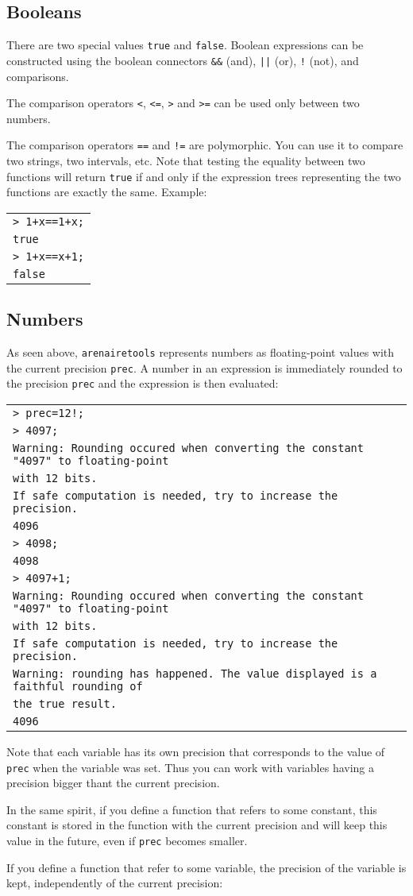 \documentclass[a4paper]{article}
\newcommand{\com}[1]{\texttt{#1}}
\newcommand{\key}[1]{\texttt{#1}}
\newcommand{\arenairetools}{\texttt{arenairetools}\xspace}
\newcommand{\code}[1]{\begin{center}
\begin{tabular}{|p{14.8cm}|}
\hline
#1
\hline
\end{tabular}
\end{center}
}
\newcommand{\ligne}[1]{\texttt{#1}\\}
\begin{document}
\subsection{Booleans}
There are two special values \key{true} and \key{false}. Boolean expressions can be constructed using the boolean connectors \key{\&\&} (and), \key{||} (or), \key{!} (not), and comparisons.

The comparison operators \key{<}, \key{<=}, \key{>} and \key{>=} can be used only between two numbers.

The comparison operators \key{==} and \key{!=} are polymorphic. You can use it to compare two strings, two intervals, etc. Note that testing the equality between two functions will return \key{true} if and only if the expression trees representing the two functions are exactly the same. Example:

\code{
\ligne{> 1+x==1+x;}
\ligne{true}
\ligne{> 1+x==x+1;}
\ligne{false}
}

\subsection{Numbers}
As seen above, \arenairetools represents numbers as floating-point values with the current precision \com{prec}. A number in an expression is immediately rounded to the precision \com{prec} and the expression is then evaluated:

\code{
\ligne{> prec=12!;}
\ligne{> 4097;}
\ligne{Warning: Rounding occured when converting the constant "4097" to floating-point}
\ligne{with 12 bits.}
\ligne{If safe computation is needed, try to increase the precision.}
\ligne{4096}
\ligne{> 4098;}
\ligne{4098}
\ligne{> 4097+1;}
\ligne{Warning: Rounding occured when converting the constant "4097" to floating-point}
\ligne{with 12 bits.}
\ligne{If safe computation is needed, try to increase the precision.}
\ligne{Warning: rounding has happened. The value displayed is a faithful rounding of}
\ligne{the true result.}
\ligne{4096}
}

Note that each variable has its own precision that corresponds to the value of \com{prec} when the variable was set. Thus you can work with variables having a precision bigger thant the current precision.

In the same spirit, if you define a function that refers to some constant, this constant is stored in the function with the current precision and will keep this value in the future, even if \com{prec} becomes smaller.

If you define a function that refer to some variable, the precision of the variable is kept, independently of the current precision:
\end{document}
